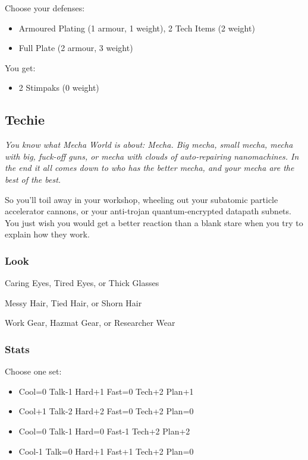 Choose your defenses:
\begin{itemize}
\item Armoured Plating (1 armour, 1 weight), 2 Tech Items (2 weight)
\item Full Plate (2 armour, 3 weight)
\end{itemize}

You get:
\begin{itemize}
\item 2 Stimpaks (0 weight)
\end{itemize}



\subsection{Techie}
{\itshape You know what Mecha World is about: Mecha. Big mecha, small
  mecha, mecha with big, fuck-off guns, or mecha with clouds of
  auto-repairing nanomachines. In the end it all comes down to who has
  the better mecha, and your mecha are the best of the best.

So you'll toil away in your workshop, wheeling out your subatomic
particle accelerator cannons, or your anti-trojan quantum-encrypted
datapath subnets. You just wish you would get a better reaction than a
blank stare when you try to explain how they work.}

\subsubsection{Look}

Caring Eyes, Tired Eyes, or Thick Glasses

Messy Hair, Tied Hair, or Shorn Hair

Work Gear, Hazmat Gear, or Researcher Wear

\subsubsection{Stats}
Choose one set:
\begin{itemize}
\setlength\itemsep{0em}
\item Cool=0 Talk-1 Hard+1 Fast=0 Tech+2 Plan+1
\item Cool+1 Talk-2 Hard+2 Fast=0 Tech+2 Plan=0
\item Cool=0 Talk-1 Hard=0 Fast-1 Tech+2 Plan+2
\item Cool-1 Talk=0 Hard+1 Fast+1 Tech+2 Plan=0
\end{itemize}

